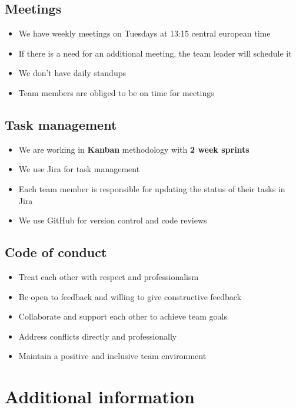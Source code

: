 \documentclass[12pt]{article}
\begin{document}
\subsection{Meetings}
\begin{itemize}
    \item We have weekly meetings on Tuesdays at 13:15 central european time
    \item If there is a need for an additional meeting, the team leader will schedule it
    \item We don't have daily standups
    \item Team members are obliged to be on time for meetings
\end{itemize}
\subsection{Task management}
\begin{itemize}
    \item We are working in \textbf{Kanban} methodology with \textbf{2 week sprints}
    \item We use Jira for task management
    \item Each team member is responsible for updating the status of their tasks in Jira
    \item We use GitHub for version control and code reviews
\end{itemize}
\subsection{Code of conduct}
\begin{itemize}
    \item Treat each other with respect and professionalism
    \item Be open to feedback and willing to give constructive feedback
    \item Collaborate and support each other to achieve team goals
    \item Address conflicts directly and professionally
    \item Maintain a positive and inclusive team environment
\end{itemize}
\section{Additional information}
\end{document}
